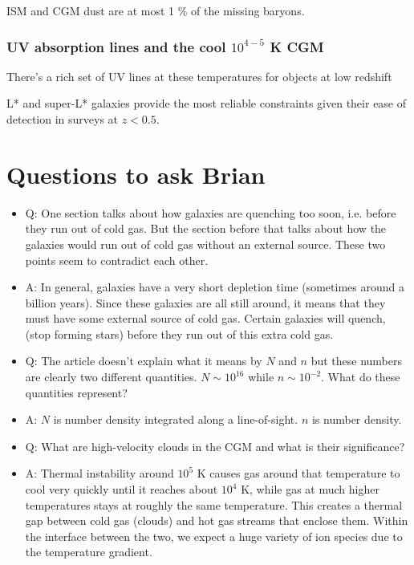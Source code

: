 \documentclass[12pt]{article}
\begin{document}
ISM and CGM dust are at most 1 \% of the missing baryons.

\subsubsection{UV absorption lines and the cool $10^{4-5}$ K CGM}

There's a rich set of UV lines at these temperatures for objects at low redshift

L* and super-L* galaxies provide the most reliable constraints given their ease of detection in surveys at $z < 0.5$. 

\section{Questions to ask Brian}
\begin{itemize}
\item{Q: One section talks about how galaxies are quenching too soon, i.e. before they run out of cold gas. But the
section before that talks about how the galaxies would run out of cold gas without an external source. These
two points seem to contradict each other.}

\item{A: In general, galaxies have a very short depletion time (sometimes around a billion years). Since these galaxies are
all still around, it means that they must have some external source of cold gas. Certain galaxies will quench, (stop
forming stars) before they run out of this extra cold gas. }

\item{Q: The article doesn't explain what it means by $N$ and $n$ but these numbers are clearly two different
    quantities. $N \sim 10^{16}$ while $n \sim 10^{-2}$. What do these quantities represent?}

\item{A:  $N$ is number density integrated along a line-of-sight. $n$ is number density.}

\item{Q: What are high-velocity clouds in the CGM and what is their significance?}

\item{A:  Thermal instability around $10^5$ K causes gas around that temperature to cool very quickly until it reaches about $10^4$ K, while gas at much
  higher temperatures stays at roughly the same temperature. This creates a thermal gap between cold gas (clouds) and hot gas streams that enclose them.
  Within the interface between the two, we expect a huge variety of ion species due to the temperature gradient. }


\end{itemize}
\end{document}
